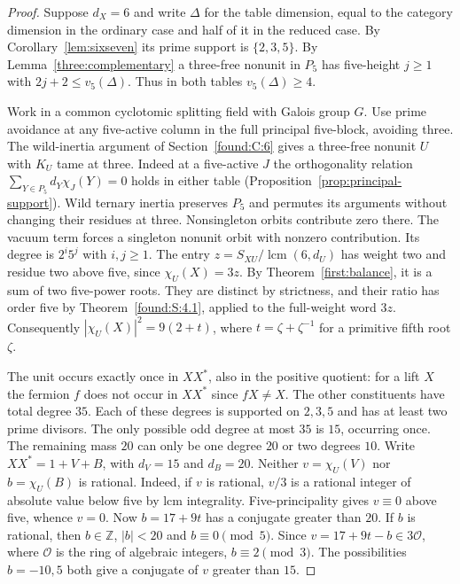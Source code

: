 \documentclass[11pt,a4paper]{article}
\numberwithin{equation}{section}
\theoremstyle{remark}
\newcommand{\ZZ}{\mathbb Z}
\newcommand{\lcm}{\operatorname{lcm}}
\begin{document}
\begin{proof}
Suppose $d_X=6$ and write $\Delta$ for the table dimension, equal to
the category dimension in the ordinary case and half of it in the reduced
case. By Corollary~\ref{lem:sixseven} its prime support is $\{2,3,5\}$. By Lemma~\ref{three:complementary} a three-free nonunit in $P_5$ has
five-height $j\ge1$ with $2j+2\le v_5(\Delta)$. Thus in both
tables $v_5(\Delta)\ge4$.

Work in a common cyclotomic splitting field with Galois group $G$.
Use prime avoidance at any five-active column in
the full principal five-block, avoiding three. The wild-inertia argument
of Section~\ref{found:C:6} gives a three-free nonunit $U$ with $K_U$ tame at three.
Indeed at a five-active $J$ the orthogonality relation
$\sum_{Y\in P_5}d_Y\chi_J(Y)=0$ holds in either table (Proposition~\ref{prop:principal-support}). Wild ternary inertia preserves $P_5$
and permutes its arguments without changing their residues at three.
Nonsingleton orbits contribute zero there. The vacuum term forces
a singleton nonunit orbit with nonzero contribution.
Its degree is $2^i5^j$ with $i,j\ge1$. The entry
$z=S_{XU}/\lcm(6,d_U)$ has weight two and residue two
above five, since $\chi_U(X)=3z$. By Theorem~\ref{first:balance}, it is a sum
of two five-power roots. They are distinct by strictness, and their
ratio has order five by Theorem~\ref{found:S:4.1}, applied to the full-weight
word $3z$. Consequently $|\chi_U(X)|^2=9(2+t)$, where
$t=\zeta+\zeta^{-1}$ for a primitive fifth root $\zeta$.

The unit occurs exactly once in $XX^*$, also in the positive quotient:
for a lift $X$ the fermion $f$ does not occur in $XX^*$ since $fX\ne X$.
The other constituents have total degree $35$. Each of these degrees
is supported on $2,3,5$ and has at least two prime divisors. The only possible
odd degree at most $35$ is $15$, occurring once. The remaining mass $20$
can only be one degree $20$ or two degrees $10$. Write $XX^*=1+V+B$,
with $d_V=15$ and $d_B=20$. Neither $v=\chi_U(V)$ nor $b=\chi_U(B)$
is rational. Indeed, if $v$ is rational, $v/3$ is a rational integer
of absolute value below five by lcm integrality. Five-principality gives
$v\equiv0$ above five, whence $v=0$. Now $b=17+9t$ has a conjugate
greater than $20$. If $b$ is rational, then $b\in\ZZ$, $|b|<20$ and
$b\equiv0\pmod5$. Since $v=17+9t-b\in3\mathcal O$, where $\mathcal O$
is the ring of algebraic integers, $b\equiv2\pmod3$. The possibilities
$b=-10,5$ both give a conjugate of $v$ greater than $15$.


\end{proof}
\end{document}
